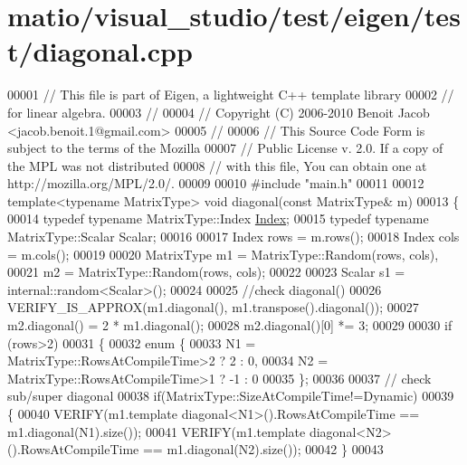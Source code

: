 \hypertarget{matio_2visual__studio_2test_2eigen_2test_2diagonal_8cpp_source}{}\section{matio/visual\+\_\+studio/test/eigen/test/diagonal.cpp}
\label{matio_2visual__studio_2test_2eigen_2test_2diagonal_8cpp_source}

\begin{DoxyCode}
00001 \textcolor{comment}{// This file is part of Eigen, a lightweight C++ template library}
00002 \textcolor{comment}{// for linear algebra.}
00003 \textcolor{comment}{//}
00004 \textcolor{comment}{// Copyright (C) 2006-2010 Benoit Jacob <jacob.benoit.1@gmail.com>}
00005 \textcolor{comment}{//}
00006 \textcolor{comment}{// This Source Code Form is subject to the terms of the Mozilla}
00007 \textcolor{comment}{// Public License v. 2.0. If a copy of the MPL was not distributed}
00008 \textcolor{comment}{// with this file, You can obtain one at http://mozilla.org/MPL/2.0/.}
00009 
00010 \textcolor{preprocessor}{#include "main.h"}
00011 
00012 \textcolor{keyword}{template}<\textcolor{keyword}{typename} MatrixType> \textcolor{keywordtype}{void} diagonal(\textcolor{keyword}{const} MatrixType& m)
00013 \{
00014   \textcolor{keyword}{typedef} \textcolor{keyword}{typename} MatrixType::Index \hyperlink{namespace_eigen_a62e77e0933482dafde8fe197d9a2cfde}{Index};
00015   \textcolor{keyword}{typedef} \textcolor{keyword}{typename} MatrixType::Scalar Scalar;
00016 
00017   Index rows = m.rows();
00018   Index cols = m.cols();
00019 
00020   MatrixType m1 = MatrixType::Random(rows, cols),
00021              m2 = MatrixType::Random(rows, cols);
00022 
00023   Scalar s1 = internal::random<Scalar>();
00024 
00025   \textcolor{comment}{//check diagonal()}
00026   VERIFY\_IS\_APPROX(m1.diagonal(), m1.transpose().diagonal());
00027   m2.diagonal() = 2 * m1.diagonal();
00028   m2.diagonal()[0] *= 3;
00029 
00030   \textcolor{keywordflow}{if} (rows>2)
00031   \{
00032     \textcolor{keyword}{enum} \{
00033       N1 = MatrixType::RowsAtCompileTime>2 ?  2 : 0,
00034       N2 = MatrixType::RowsAtCompileTime>1 ? -1 : 0
00035     \};
00036 
00037     \textcolor{comment}{// check sub/super diagonal}
00038     \textcolor{keywordflow}{if}(MatrixType::SizeAtCompileTime!=Dynamic)
00039     \{
00040       VERIFY(m1.template diagonal<N1>().RowsAtCompileTime == m1.diagonal(N1).size());
00041       VERIFY(m1.template diagonal<N2>().RowsAtCompileTime == m1.diagonal(N2).size());
00042     \}
00043 

\end{DoxyCode}
